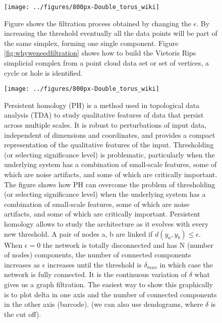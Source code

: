 \documentclass[onecollarge,runningheads]{svjour2}
\begin{document}
\begin{figure}[h]
        \centering
        \texttt{[image: ../figures/800px-Double\_torus\_wiki]}
        \caption{Figure shows the filtration process obtained by changing the $\epsilon$. By increasing the threshold eventually all the data points will be part of the same simplex, forming one single component. Figure \ref{fig:whyweneedfiltration} shows how to build the Vietoris Rips simplicial complex from a point cloud data set or set of vertices, a cycle or hole is identified.}
\label{fig:filtration}
\end{figure}




\begin{figure}[h]
        \centering
        \texttt{[image: ../figures/800px-Double\_torus\_wiki]}
        \caption{Persistent homology (PH) is a method used in topological data analysis (TDA) to study qualitative features of data that persist across multiple scales. It is robust to perturbations of input data, independent of dimensions and coordinates, and provides a compact representation of the qualitative features of the input. 
Thresholding (or selecting significance level) is problematic, particularly when the underlying system has a combination of small-scale features, some of which are noise artifacts, and some of which are critically important. The figure shows how PH can overcome the problem of thresholding (or selecting significance level) when the underlying system has a combination of small-scale features, some of which are noise artifacts, and some of which are critically important. Persistent homology allows to study the architecture as it evolves with every new threshold. A pair of nodes a, b are linked if $d(y_a, y_b) \leq \epsilon$. When $\epsilon = 0$ the network is totally disconnected and has N (number of nodes) components, the number of connected components increases as $\epsilon$ increases until the threshold is $\delta_{max}$ in which case the network is fully connected. It is the continuous variation of $\delta$ what gives us a graph filtration. The easiest way to show this graphically is to plot delta in one axis and the number of connected components in the other axis (barcode). (we can also use dendograms, where $\delta$ is the cut off). 
}
\label{fig:ph}
\end{figure}
\end{document}
